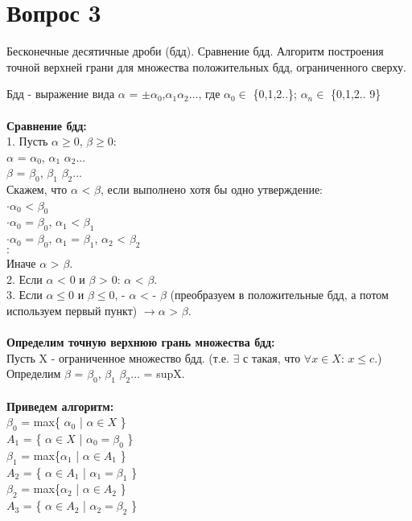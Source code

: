\documentclass{article}
\DeclareMathOperator{\Exists}{\exists}
\DeclareMathOperator{\Forall}{\forall}
\begin{document}
\bigskip\bigskip
\section*{Вопрос 3}
 
\begin{center}
  {Бесконечные десятичные дроби (бдд). Сравнение бдд. Алгоритм построения точной верхней грани для множества положительных бдд, ограниченного сверху.}
\end{center}
 
   Бдд - выражение вида $\alpha$ = $\pm \alpha_0$,$\alpha_1\alpha_2$..., где $\alpha_0 \in $ \{0,1,2..\};
   $\alpha_n \in$ \{0,1,2.. 9\}\\
   \\
   \textbf{Сравнение бдд:}\\
   1. Пусть $\alpha \geq 0$, $ \beta \geq 0$: \\
       $\alpha$ = $\alpha_0$, $\alpha_1$ $\alpha_2$... \\
       $\beta$ = $\beta_0$, $\beta_1$ $\beta_2$... \\
       Скажем, что $\alpha$ < $\beta$, если выполнено хотя бы одно утверждение: \\
       $\cdot  \alpha_0$ < $\beta_0$ \\
       $\cdot  \alpha_0$ = $\beta_0$, $\alpha_1$ < $\beta_1$ \\
       $\cdot  \alpha_0$ = $\beta_0$, $\alpha_1$ = $\beta_1$, $\alpha_2$ < $\beta_2$ \\
       $\cdot$ \\
       $\cdot$ \\
       Иначе $ \alpha$ > $\beta$. \\
   2. Если $\alpha$ < 0  и $\beta$ > 0: $\alpha$ < $\beta$. \\
   3. Если $\alpha \leq 0 $ и $ \beta \leq 0$, - $\alpha$ < - $\beta$ (преобразуем в положительные бдд, а потом используем первый пункт) $ \rightarrow  \alpha$ > $\beta$. \\
   \\
   \textbf{Определим точную верхнюю грань множества бдд:} \\
   Пусть X - ограниченное множество бдд.
   (т.е. $\Exists$ с такая, что $\Forall x \in X$: $ x \leq c$.) \\
   Определим $\beta$ = $\beta_0$, $\beta_1$ $\beta_2$... = supX. \\
   \\
   \textbf{Приведем алгоритм: } \\
   $\beta_0$ = max\{ $\alpha_0$ | $\alpha \in X$ \} \\
   $A_1$ = \{ $\alpha \in X$ | $ \alpha_0 = \beta_0$ \} \\
   $\beta_1$ = max\{$\alpha_1$ | $\alpha \in A_1$ \} \\
   $A_2$ = \{ $\alpha \in A_1$ | $ \alpha_1 = \beta_1$ \} \\
   $\beta_2$ = max\{$\alpha_2$ | $\alpha \in A_2$ \} \\
   $A_3$ = \{ $\alpha \in A_2$ | $ \alpha_2 = \beta_2$ \} \\
 
\end{document}
